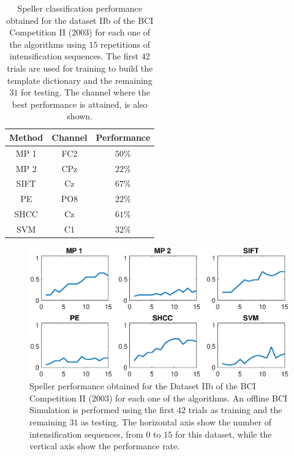 \begin{table}[h!]
\caption[Dataset IIb BCI Competition II (2003) Speller Performance]{Speller classification performance obtained for the dataset IIb of the BCI Competition II (2003) for each one of the algorithms using $15$ repetitions of intensification sequences. The first $42$ trials are used for training to build the template dictionary and the remaining $31$ for testing. The channel where the best performance is attained, is also shown. }
\centering
\begin{tabular}{ccc}
\toprule
\textbf{Method}	& \textbf{Channel} &  \textbf{Performance} \\
\midrule
MP 1 & FC2  & $50\%$ \\
MP 2 & CPz & $22\%$ \\
SIFT  & Cz & $67\%$ \\
PE     & PO8 & $22\%$ \\
SHCC & Cz & $61\%$ \\
SVM     & C1  & $32\%$ \\
\bottomrule
\end{tabular}
\label{tab:bcicompetitionresults}
\end{table}

\begin{figure}[h!]
\centering
\includegraphics[width=15cm]{images/PerformanceBCICompetition.eps}
\caption[Dataset IIb BCI Competition II (2003) Speller Performance]{Speller performance obtained for the Dataset IIb of the BCI Competition II (2003) for each one of the algorithms.  An offline BCI Simulation is performed using the first $42$ trials as training and the remaining $31$ as testing.  The horizontal axis show the number of intensification sequences, from $0$ to $15$ for this dataset, while the vertical axis show the performance rate.}
\label{fig:performancebcicompetition}
\end{figure}

